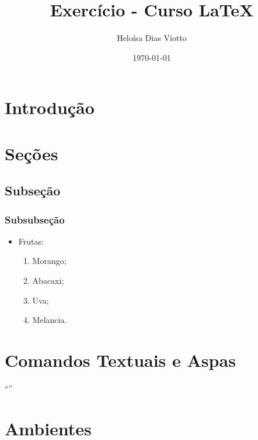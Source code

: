 \documentclass[twocolumn]{article}
\title{Exercício - Curso \LaTeX}
\author{Heloísa Dias Viotto}
\date{\today}
\begin{document}
\maketitle

\section{Introdução}

    \lipsum[1]

\section{Seções}

    \lipsum[1]

    \subsection{Subseção}

        \lipsum[1]

        \subsubsection*{Subsubseção}

            \lipsum[1]

            \begin{itemize}
                \item Frutas:
                \begin{enumerate}
                    \item Morango;
                    \item Abacaxi;
                    \item Uva;
                    \item Melancia.                   
                \end{enumerate}                
            \end{itemize}

\section{Comandos Textuais e Aspas}

    \textit{\lipsum[1]}
    
    \textbf{\lipsum[1]}

    \textcolor{blue}{\lipsum[1]}

    ``\lipsum[1]''

\section{Ambientes}
\end{document}
